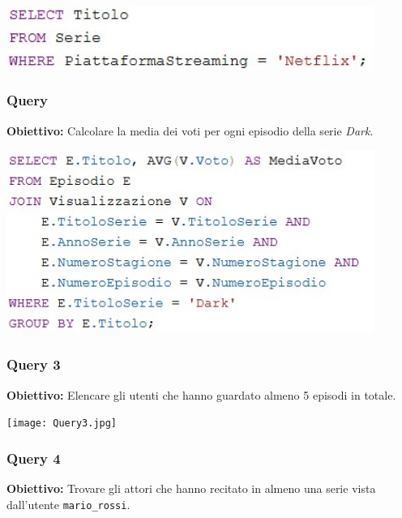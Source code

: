 \documentclass[12pt,a4paper]{article}
\begin{document}
\vspace{0.5cm}
\begin{center}
\includegraphics[width=0.9\textwidth]{Query1.jpg}
\end{center}

\vspace{1cm}

\subsubsection*{Query }
\textbf{Obiettivo:} Calcolare la media dei voti per ogni episodio della serie \textit{Dark}.

\vspace{0.5cm}
\begin{center}
\includegraphics[width=0.9\textwidth]{Query2.jpg}
\end{center}

\vspace{1cm}

\subsubsection*{Query 3}
\textbf{Obiettivo:} Elencare gli utenti che hanno guardato almeno 5 episodi in totale.

\vspace{0.5cm}
\begin{center}
\texttt{[image: Query3.jpg]}
\end{center}

\vspace{1cm}

\subsubsection*{Query 4}
\textbf{Obiettivo:} Trovare gli attori che hanno recitato in almeno una serie vista dall’utente \texttt{mario\_rossi}.
\end{document}

